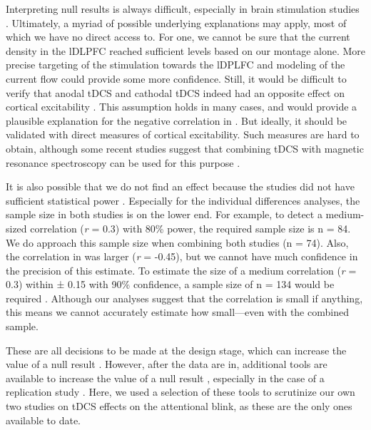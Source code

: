 \documentclass[11pt,]{memoir}
\begin{document}
Interpreting null results is always difficult, especially in brain stimulation studies \autocite{DeGraaf2018}. Ultimately, a myriad of possible underlying explanations may apply, most of which we have no direct access to. For one, we cannot be sure that the current density in the lDLPFC reached sufficient levels \autocites{Kim2014}{Opitz2015} based on our montage alone. More precise targeting of the stimulation towards the lDPLFC \autocite{Datta2009} and modeling of the current flow \autocites{DeBerker2013}{Karabanov2019} could provide some more confidence. Still, it would be difficult to verify that anodal tDCS and cathodal tDCS indeed had an opposite effect on cortical excitability \autocites{Bestmann2014}{Bestmann2017}. This assumption holds in many cases, and would provide a plausible explanation for the negative correlation in \textcites{London2015}{Krause2014}. But ideally, it should be validated with direct measures of cortical excitability. Such measures are hard to obtain, although some recent studies suggest that combining tDCS with magnetic resonance spectroscopy can be used for this purpose \autocites{Filmer2019}{Antonenko2019}{Talsma2018}.

It is also possible that we do not find an effect because the studies did not have sufficient statistical power \autocite{Minarik2016}. Especially for the individual differences analyses, the sample size in both studies is on the lower end. For example, to detect a medium-sized correlation (\emph{r} = 0.3) with 80\% power, the required sample size is n = 84. We do approach this sample size when combining both studies (n = 74). Also, the correlation in \textcite{London2015} was larger (\emph{r} = -0.45), but we cannot have much confidence in the precision of this estimate. To estimate the size of a medium correlation (\emph{r} = 0.3) within ± 0.15 with 90\% confidence, a sample size of n = 134 would be required \autocite{Schonbrodt2013}. Although our analyses suggest that the correlation is small if anything, this means we cannot accurately estimate how small---even with the combined sample.

These are all decisions to be made at the design stage, which can increase the value of a null result \autocite{DeGraaf2018}. However, after the data are in, additional tools are available to increase the value of a null result \autocite{Harms2018}, especially in the case of a replication study \autocite{Simonsohn2015}. Here, we used a selection of these tools to scrutinize our own two studies on tDCS effects on the attentional blink, as these are the only ones available to date.
\end{document}
